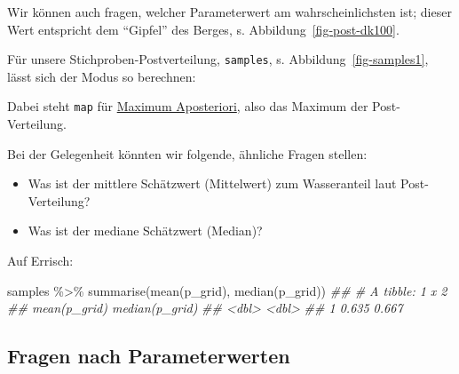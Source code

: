 \documentclass[
  a4paper,
  DIV=11]{scrreprt}
\newenvironment{Shaded}{\begin{snugshade}}{\end{snugshade}}
\newcommand{\DocumentationTok}[1]{\textcolor[rgb]{0.37,0.37,0.37}{\textit{#1}}}
\newcommand{\FunctionTok}[1]{\textcolor[rgb]{0.28,0.35,0.67}{#1}}
\newcommand{\NormalTok}[1]{\textcolor[rgb]{0.00,0.23,0.31}{#1}}
\newcommand{\SpecialCharTok}[1]{\textcolor[rgb]{0.37,0.37,0.37}{#1}}
\providecommand{\tightlist}{%
  \setlength{\itemsep}{0pt}\setlength{\parskip}{0pt}}\usepackage{longtable,booktabs,array}
\theoremstyle{definition}
\theoremstyle{remark}
\begin{document}
Wir können auch fragen, welcher Parameterwert am wahrscheinlichsten ist;
dieser Wert entspricht dem ``Gipfel'' des Berges, s.
Abbildung~\ref{fig-post-dk100}.

Für unsere Stichproben-Postverteilung, \texttt{samples}, s.
Abbildung~\ref{fig-samples1}, lässt sich der Modus so berechnen:

\begin{Shaded}
\end{Shaded}

Dabei steht \texttt{map} für
\href{https://easystats.github.io/bayestestR/reference/map_estimate.html}{Maximum
Aposteriori}, also das Maximum der Post-Verteilung.

Bei der Gelegenheit könnten wir folgende, ähnliche Fragen stellen:

\begin{itemize}
\tightlist
\item
  Was ist der mittlere Schätzwert (Mittelwert) zum Wasseranteil laut
  Post-Verteilung?
\item
  Was ist der mediane Schätzwert (Median)?
\end{itemize}

Auf Errisch:

\begin{Shaded}
\begin{Highlighting}[]
\NormalTok{samples }\SpecialCharTok{\%\textgreater{}\%} 
  \FunctionTok{summarise}\NormalTok{(}\FunctionTok{mean}\NormalTok{(p\_grid),}
            \FunctionTok{median}\NormalTok{(p\_grid))}
\DocumentationTok{\#\# \# A tibble: 1 x 2}
\DocumentationTok{\#\#   \textasciigrave{}mean(p\_grid)\textasciigrave{} \textasciigrave{}median(p\_grid)\textasciigrave{}}
\DocumentationTok{\#\#            \textless{}dbl\textgreater{}            \textless{}dbl\textgreater{}}
\DocumentationTok{\#\# 1          0.635            0.667}
\end{Highlighting}
\end{Shaded}

\hypertarget{fragen-nach-parameterwerten}{%
\subsection{Fragen nach
Parameterwerten}\label{fragen-nach-parameterwerten}}
\end{document}

